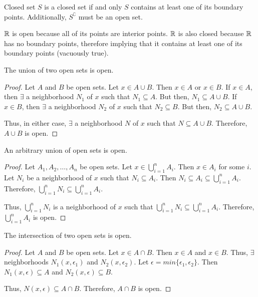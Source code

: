 \begin{definition}{Closed set}{}
    $S$ is a closed set if and only $S$ contains at least one of its boundary points. Additionally, $S^\complement$ must be an open set.
\end{definition}

\begin{note}
    $\mathbb{R}$ is open because all of its points are interior points. $\mathbb{R}$ is also closed because $\mathbb{R}$ has no boundary points, therefore implying that it contains at least one of its boundary points (vacuously true).
\end{note}

\begin{theorem}{}{}
    The union of two open sets is open.
\end{theorem}
\begin{proof}
    Let $A$ and $B$ be open sets. Let $x \in A \cup B$. Then $x \in A$ or $x \in B$. If $x \in A$, then $\exists$ a neighborhood $N_1$ of $x$ such that $N_1 \subseteq A$. But then, $N_1 \subseteq A \cup B$. If $x \in B$, then $\exists$ a neighborhood $N_2$ of $x$ such that $N_2 \subseteq B$. But then, $N_2 \subseteq A \cup B$. 
    
    Thus, in either case, $\exists$ a neighborhood $N$ of $x$ such that $N \subseteq A \cup B$. Therefore, $A \cup B$ is open.
\end{proof}

\begin{theorem}{}{}
    An arbitrary union of open sets is open.
\end{theorem}
\begin{proof}
    Let $A_1, A_2, \ldots, A_n$ be open sets. Let $x \in \bigcup_{i=1}^n A_i$. Then $x \in A_i$ for some $i$. Let $N_i$ be a neighborhood of $x$ such that $N_i \subseteq A_i$. Then $N_i \subseteq A_i \subseteq \bigcup_{i=1}^n A_i$. Therefore, $\bigcup_{i=1}^n N_i \subseteq \bigcup_{i=1}^n A_i$. 
    
    Thus, $\bigcup_{i=1}^n N_i$ is a neighborhood of $x$ such that $\bigcup_{i=1}^n N_i \subseteq \bigcup_{i=1}^n A_i$. Therefore, $\bigcup_{i=1}^n A_i$ is open.
\end{proof}

\begin{theorem}{}{}
    The intersection of two open sets is open.
\end{theorem}
\begin{proof}
    Let $A$ and $B$ be open sets. Let $x \in A \cap B$. Then $x \in A$ and $x \in B$. Thus, $\exists$ neighborhoods $N_1(x, \epsilon_1)$ and $N_2(x, \epsilon_2)$. Let $\epsilon = min\{\epsilon_1, \epsilon_2\}$. Then $N_1(x, \epsilon) \subseteq A$ and $N_2(x, \epsilon) \subseteq B$. 
    
    Thus, $N(x, \epsilon) \subseteq A \cap B$. Therefore, $A \cap B$ is open.
\end{proof}

